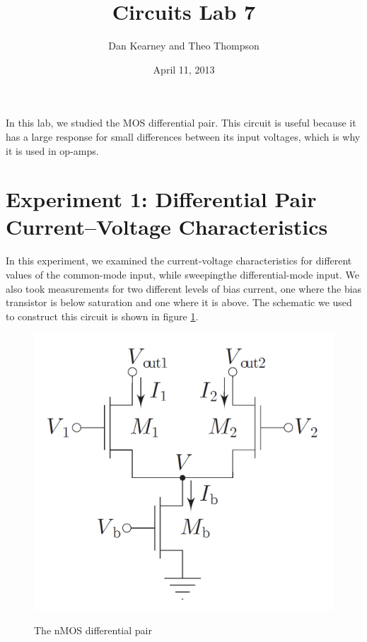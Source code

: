\documentclass{article}
\title{Circuits Lab 7}
\author{Dan Kearney and Theo Thompson}
\date{April 11, 2013}
\begin{document}
\maketitle
In this lab, we studied the MOS differential pair. This circuit is useful because it has a large response for small differences between its input voltages, which is why it is used in op-amps.
\section*{Experiment 1: Differential Pair Current–Voltage Characteristics}
In this experiment, we examined the current-voltage characteristics for different values of the common-mode input, while sweepingthe differential-mode input. We also took measurements for two different levels of bias current, one where the bias transistor is below saturation and one where it is above. The schematic we used to construct this circuit is shown in figure \ref{schem}. 
\begin{figure}[H]
\centering
\includegraphics[scale=.3]{diffSchem.png}
\label{schem}
\caption{The nMOS differential pair}
\end{figure}
\end{document}
